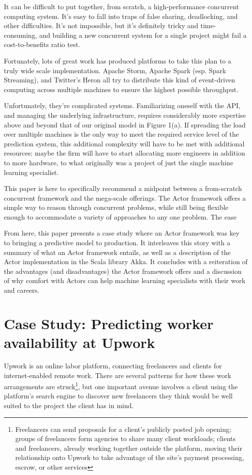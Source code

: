 \documentclass{article}
\begin{document}
It can be difficult to put together, from scratch, a high-performance concurrent computing system. It's easy to fall into traps of false sharing, deadlocking, and other difficulties. It's not impossible, but it's definitely tricky and time-consuming, and building a new concurrent system for a single project might fail a cost-to-benefits ratio test.

Fortunately, lots of great work has produced platforms to take this plan to a truly wide scale implementation. Apache Storm, Apache Spark (esp. Spark Streaming), and Twitter's Heron all try to distribute this kind of event-driven computing across multiple machines to ensure the highest possible throughput.

Unfortunately, they're complicated systems. Familiarizing oneself with the API, and managing the underlying infrastructure, requires considerably more expertise above and beyond that of our original model in Figure 1(a). If spreading the load over multiple machines is the only way to meet the required service level of the prediction system, this additional complexity will have to be met with additional resources: maybe the firm will have to start allocating more engineers in addition to more hardware, to what originally was a project of just the single machine learning specialist.

This paper is here to specifically recommend a midpoint between a from-scratch concurrent framework and the mega-scale offerings. The Actor framework offers a simple way to reason through concurrent problems, while still being flexible enough to accommodate a variety of approaches to any one problem. The ease 

From here, this paper presents a case study where an Actor framework was key to bringing a predictive model to production. It interleaves this story with a summary of what an Actor framework entails, as well as a description of the Actor implementation in the Scala library Akka. It concludes with a reiteration of the advantages (and disadvantages) the Actor framework offers and a discussion of why comfort with Actors can help machine learning specialists with their work and careers.

\section{Case Study: Predicting worker availability at Upwork}

Upwork is an online labor platform, connecting freelancers and clients for internet-enabled remote work. There are several patterns for how these work arrangements are struck\footnote{Freelancers can send proposals for a client's publicly posted job opening; groups of freelancers form agencies to share many client workloads; clients and freelancers, already working together outside the platform, moving their relationship onto Upwork to take advantage of the site's payment processing, escrow, or other services}, but one important avenue involves a client using the platform's search engine to discover new freelancers they think would be well suited to the project the client has in mind.
\end{document}
